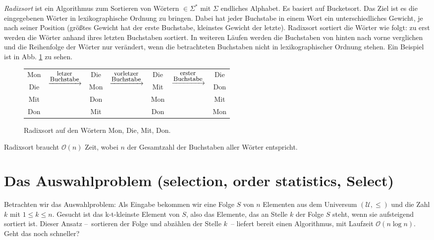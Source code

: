 \textit{Radixsort} ist ein Algorithmus zum Sortieren von Wörtern $\in \Sigma^*$ mit $\Sigma$ endliches Alphabet. Es basiert auf Bucketsort. Das Ziel ist es die eingegebenen Wörter in lexikographische Ordnung zu bringen. Dabei hat jeder Buchstabe in einem Wort ein unterschiedliches Gewicht, je nach seiner Position (größtes Gewicht hat der erste Buchstabe, kleinstes Gewicht der letzte). Radixsort sortiert die Wörter wie folgt: zu erst werden die Wörter anhand ihres letzten Buchstaben sortiert. In weiteren Läufen werden die Buchstaben von hinten nach vorne verglichen und die Reihenfolge der Wörter nur verändert, wenn die betrachteten Buchstaben nicht in lexikographischer Ordnung stehen. Ein Beispiel ist in Abb. \ref{radixBsp} zu sehen.

\begin{figure}[hbt]
\centering
\begin{tabular}{ccccccc}
Mon & \multirow{4}{*}{$\xrightarrow{\stackrel{\text{\small letzer}}{\text{\small Buchstabe}}}$} & Die & \multirow{4}{*}{$\xrightarrow{\stackrel{\text{\small vorletzer}}{\text{\small Buchstabe}}}$}& Die & \multirow{4}{*}{$\xrightarrow{\stackrel{\text{\small erster}}{\text{\small Buchstabe}}}$} & Die \\
Die &  & Mon & & Mit & & Don \\
Mit &  & Don & & Mon & & Mit \\
Don &  & Mit & & Don & & Mon \\
\end{tabular}
\caption{Radixsort auf den Wörtern Mon, Die, Mit, Don.}\label{radixBsp}
\end{figure}


Radixsort braucht $\mathcal{O}(n)$ Zeit, wobei $n$ der Gesamtzahl der Buchstaben aller Wörter entspricht.

\section{Das Auswahlproblem (selection, order statistics, Select)}
Betrachten wir das Auswahlproblem: Als Eingabe bekommen wir eine Folge $S$ von $n$ Elementen aus dem Universum $(\mathcal{U}, \le)$ und die Zahl $k$ mit $1 \le k \le n$. Gesucht ist das k-t-kleinste Element von $S$, also das Elemente, das an Stelle $k$ der Folge $S$ steht, wenn sie aufsteigend sortiert ist. Dieser Ansatz --~sortieren der Folge und abzählen der Stelle $k$~-- liefert bereit einen Algorithmus, mit Laufzeit $\mathcal{O}(n \log n)$. Geht das noch schneller?

